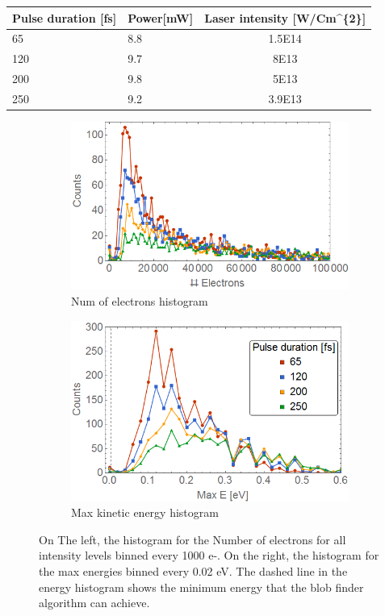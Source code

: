    
\begin{table}[]
\centering
\label{tab:pulsepower}
\begin{tabular}{|l|l|c|}
\hline
Pulse duration {[}fs{]} & \multicolumn{1}{c|}{Power{[}mW{]}} & Laser intensity {[}W/Cm\textasciicircum{}\{2\}{]} \\ \hline
65 & 8.8 & 1.5E14 \\ \hline
120 & 9.7 & 8E13 \\ \hline
200 & 9.8 & 5E13 \\ \hline
250 & 9.2 & 3.9E13 \\ \hline
\end{tabular}
\end{table}


\begin{figure}[h!]
\centering
\begin{subfigure}[l]{0.49\textwidth}\caption{Num of electrons histogram}
\includegraphics[width=1\textwidth]{../Images/results/MIR_He_pulsescan/raw/histoElec.png} 
\end{subfigure}
\begin{subfigure}[l]{0.49\textwidth}\caption{Max kinetic energy histogram}
\includegraphics[width=1\textwidth]{../Images/results/MIR_He_pulsescan/raw/histoEnergc.png}   				\end{subfigure}
\caption[MIR He-intensity dependence. Histogram]{On The left, the histogram for the Number of electrons for all intensity levels binned every 1000 e-. On the right, the histogram for the max energies binned every 0.02 eV. The dashed line in the energy histogram shows the minimum energy that the blob finder algorithm can achieve.}
\label{fig:intehisto}
\end{figure}


